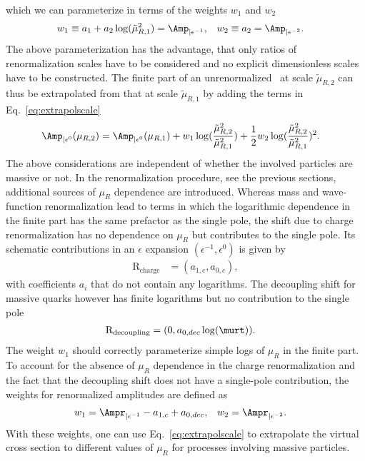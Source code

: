which we can parameterize in terms of the weights $w_1$ and $w_2$
\begin{align}\label{eq:unrenweights}
  w_1 &\equiv a_{1}+a_2
  \log(\tilde{\mu}_{R,1}^2)=\Amp_{|\epsilon^{-1}},& w_2 &\equiv a_{2} = \Amp_{|\epsilon^{-2}}. 
\end{align}
The above parameterization has the advantage, that only ratios of
renormalization scales have to be considered and no explicit
dimensionless scales have to be constructed. The finite part of an unrenormalized \ola~at scale
$\tilde{\mu}_{R,2}$ can thus be extrapolated from that at scale
$\tilde{\mu}_{R,1}$ by adding the terms in Eq.~\eqref{eq:extrapolscale}
\begin{align}\label{eq:extrapolscale2}
\begin{split}
  \Amp_{|\epsilon^{0}}({\mu}_{R,2})   &= \Amp_{|\epsilon^{0}}({\mu}_{R,1}) +
  w_1\log(\frac{\tilde{\mu}_{R,2}^2}{\tilde{\mu}_{R,1}^2})+
\frac{1}{2} w_2
\log(\frac{\tilde{\mu}_{R,2}^2}{\tilde{\mu}_{R,1}^2})^2.
\end{split}
\end{align}
The above considerations are independent
of whether the involved particles are massive or not. In the
renormalization procedure, see the previous sections, additional
sources of $\mu_R$ dependence are introduced. Whereas mass and wave-function
renormalization lead to terms in which the logarithmic dependence in
the finite part has the same prefactor as the single pole, the shift
due to charge renormalization has no dependence on $\mu_R$ but
contributes to the single pole. Its
schematic contributions in an $\epsilon$ expansion
$(\epsilon^{-1},\epsilon^0)$ is given by
\begin{align}
   \text{R}_{\text{charge}} & = (a_{1,c},a_{0,c}),
\end{align} 
with coefficients $a_i$ that do not contain any logarithms. The decoupling
shift for massive quarks however has finite logarithms but no contribution
to the single pole
\begin{align}
   \text{R}_{\text{decoupling}} & = (0,a_{0,dec}\log(\murt)).
\end{align}
The weight $w_1$ should correctly parameterize simple logs of $\mu_R$ in
the finite part. To account for the absence of $\mu_R$ dependence in the charge renormalization and the fact that the decoupling shift
does not have a single-pole contribution, the weights for renormalized
amplitudes are defined as 
\begin{align}\label{eq:reweights}
 w_1 &=\Ampr_{|\epsilon^{-1}} -a_{1,c}+ a_{0,dec}, &  w_2 &= \Ampr_{|\epsilon^{-2}}.
\end{align}
With these weights, one can use Eq.~\eqref{eq:extrapolscale} to
extrapolate the virtual cross section to different values of $\mu_R$
for processes involving massive particles.

